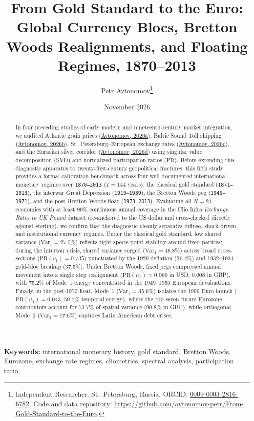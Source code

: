 \documentclass[11pt,a4paper]{article}
\title{\textbf{From Gold Standard to the Euro: Global Currency Blocs, Bretton Woods Realignments, and Floating Regimes, 1870--2013}}
\author{Petr Avtonomov\thanks{Independent Researcher, St.~Petersburg, Russia. ORCID: \href{https://orcid.org}{0009-0003-2816-6782}. Code and data repository: \url{https://github.com/avtonomov-petr/From-Gold-Standard-to-the-Euro}.}}
\date{November 2026}
\begin{document}
\maketitle

\begin{abstract}
In four preceding studies of early modern and nineteenth-century market integration, we audited Atlantic grain prices (\href{https://doi.org}{Avtonomov, 2026a}), Baltic Sound Toll shipping (\href{https://doi.org}{Avtonomov, 2026b}), St.~Petersburg--European exchange rates (\href{https://doi.org}{Avtonomov, 2026c}), and the Eurasian silver corridor (\href{https://doi.org}{Avtonomov, 2026d}) using singular value decomposition (SVD) and normalized participation ratios ($\mathrm{PR}$). Before extending this diagnostic apparatus to twenty-first-century geopolitical fractures, this fifth study provides a formal calibration benchmark across four well-documented international monetary regimes over \texttt{1870--2013} ($T = 144$ years): the classical gold standard (\texttt{1871--1913}), the interwar Great Depression (\texttt{1919--1939}), the Bretton Woods peg (\texttt{1946--1971}), and the post-Bretton Woods float (\texttt{1973--2013}). Evaluating all $N = 21$ economies with at least 90\% continuous annual coverage in the Clio Infra \emph{Exchange Rates to UK Pound} dataset (re-anchored to the US dollar and cross-checked directly against sterling), we confirm that the diagnostic cleanly separates diffuse, shock-driven, and institutional currency regimes. Under the classical gold standard, low shared variance ($\mathrm{Var}_1 = 27.0\%$) reflects tight specie-point stability around fixed parities; during the interwar crisis, shared variance surged ($\mathrm{Var}_1 = 46.8\%$) across broad cross-sections ($\mathrm{PR}(v_1) = 0.735$) punctuated by the 1920 deflation (26.4\%) and 1932--1934 gold-bloc breakup (37.5\%). Under Bretton Woods, fixed pegs compressed annual movement into a single step realignment ($\mathrm{PR}(u_1) = 0.060$ in USD; $0.008$ in GBP), with 75.2\% of Mode~1 energy concentrated in the 1949--1950 European devaluations. Finally, in the post-1973 float, Mode~1 ($\mathrm{Var}_1 = 35.6\%$) isolates the 1999 Euro launch ($\mathrm{PR}(u_1) = 0.043$, 59.7\% temporal energy), where the top seven future Eurozone contributors account for 73.7\% of spatial variance (90.8\% in GBP), while orthogonal Mode~2 ($\mathrm{Var}_2 = 17.6\%$) captures Latin American debt crises.
\end{abstract}

\noindent\textbf{Keywords:} international monetary history, gold standard, Bretton Woods, Eurozone, exchange rate regimes, cliometrics, spectral analysis, participation ratio.
\end{document}
